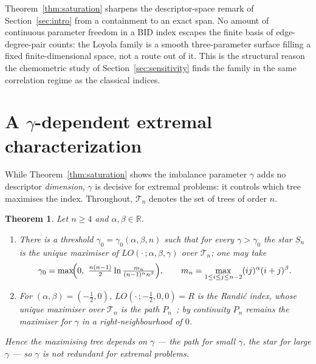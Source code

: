 \documentclass[a5paper, 10pt]{article}
\theoremstyle{plain}
\newtheorem{theorem}{Theorem}
\theoremstyle{remark}
\theoremstyle{definition}
\begin{document}
Theorem~\ref{thm:saturation} sharpens the descriptor-space remark of
Section~\ref{sec:intro} from a containment to an exact span. No
amount of continuous parameter freedom in a BID index escapes the
finite basis of edge-degree-pair counts: the Loyola family is a
smooth three-parameter surface filling a fixed finite-dimensional
space, not a route out of it. This is the structural reason the
chemometric study of Section~\ref{sec:sensitivity} finds the family
in the same correlation regime as the classical indices.

\section{A \texorpdfstring{$\gamma$}{gamma}-dependent extremal characterization}\label{sec:extremal}

While Theorem~\ref{thm:saturation} shows the imbalance parameter
$\gamma$ adds no descriptor \emph{dimension}, $\gamma$ is decisive
for extremal problems: it controls which tree maximises the index.
Throughout, $\mathcal{T}_n$ denotes the set of trees of order $n$.

\begin{theorem}\label{thm:switch}
Let $n \ge 4$ and $\alpha, \beta \in \mathbb{R}$.
\begin{enumerate}
\item There is a threshold $\gamma_0 = \gamma_0(\alpha, \beta, n)$
such that for every $\gamma > \gamma_0$ the star $S_n$ is the unique
maximiser of $LO(\cdot\,; \alpha, \beta, \gamma)$ over
$\mathcal{T}_n$; one may take
\[
\gamma_0 = \max\!\Bigl(0,\ \tfrac{n(n-1)}{2}
\ln \tfrac{m_n}{(n-1)^{\alpha} n^{\beta}}\Bigr),
\qquad
m_n = \max_{1 \le i \le j \le n-2} (ij)^{\alpha}(i+j)^{\beta}.
\]
\item For $(\alpha, \beta) = (-\tfrac12, 0)$,
$LO(\cdot\,; -\tfrac12, 0, 0) = R$ is the Randi\'c index, whose
unique maximiser over $\mathcal{T}_n$ is the path
$P_n$~\cite{BollobasErdos1998}; by continuity $P_n$ remains the
maximiser for $\gamma$ in a right-neighbourhood of $0$.
\end{enumerate}
Hence the maximising tree depends on $\gamma$ --- the path for small
$\gamma$, the star for large $\gamma$ --- so $\gamma$ is not
redundant for extremal problems.
\end{theorem}
\end{document}
